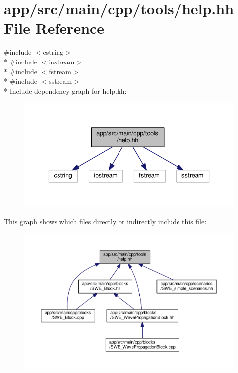 \hypertarget{help_8hh}{}\section{app/src/main/cpp/tools/help.hh File Reference}
\label{help_8hh}
{\ttfamily \#include $<$cstring$>$}\\*
{\ttfamily \#include $<$iostream$>$}\\*
{\ttfamily \#include $<$fstream$>$}\\*
{\ttfamily \#include $<$sstream$>$}\\*
Include dependency graph for help.\+hh\+:\nopagebreak
\begin{figure}[H]
\begin{center}
\leavevmode
\includegraphics[width=336pt]{help_8hh__incl}
\end{center}
\end{figure}
This graph shows which files directly or indirectly include this file\+:\nopagebreak
\begin{figure}[H]
\begin{center}
\leavevmode
\includegraphics[width=350pt]{help_8hh__dep__incl}
\end{center}
\end{figure}
